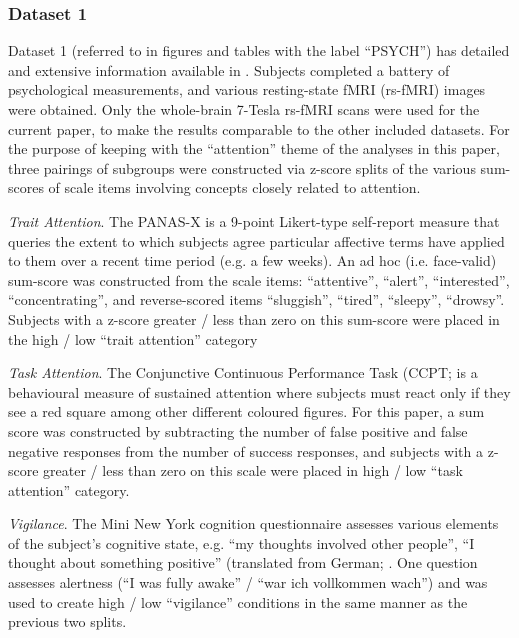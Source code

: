 \documentclass[10pt]{article}
\begin{document}
\subsubsection{Dataset 1}
Dataset 1 (referred to in figures and tables with the label ``PSYCH'') has detailed and extensive
information available in \cite{gorgolewskiHighResolution7Tesla2015}. Subjects completed a battery of
psychological measurements, and various resting-state fMRI (rs-fMRI) images were obtained. Only the
whole-brain 7-Tesla rs-fMRI scans were used for the current paper, to make the results comparable to
the other included datasets. For the purpose of keeping with the ``attention'' theme of the analyses
in this paper, three pairings of subgroups were constructed via z-score splits of the various
sum-scores of scale items involving concepts closely related to attention.

\emph{Trait Attention}.
The PANAS-X \citep{watsonPANASXManualPositive1994} is a 9-point Likert-type self-report measure
that queries the extent to which subjects agree particular affective terms have applied to them over
a recent time period (e.g. a few weeks). An ad hoc (i.e. face-valid) sum-score was constructed from
the scale items: ``attentive'', ``alert'', ``interested'', ``concentrating'', and reverse-scored items
``sluggish'', ``tired'', ``sleepy'', ``drowsy''. Subjects with a z-score greater / less than zero on this
sum-score were placed in the high / low ``trait attention'' category

\emph{Task Attention}.
The Conjunctive Continuous Performance Task (CCPT;
\cite{shalevConjunctiveContinuousPerformance2011} is a behavioural measure of sustained attention
where subjects must react only if they see a red square among other different coloured figures. For
this paper, a sum score was constructed by subtracting the number of false positive and false
negative responses from the number of success responses, and subjects with a z-score greater / less
than zero on this scale were placed in high / low ``task attention'' category.

\emph{Vigilance}.
The Mini New York cognition questionnaire assesses various elements of the subject's cognitive
state, e.g. ``my thoughts involved other people'', ``I thought about something positive'' (translated
from German; \cite{gorgolewskiCorrespondenceIndividualDifferences2014}. One question assesses
alertness (``I was fully awake'' / ``war ich vollkommen wach'') and was used to create high / low
``vigilance'' conditions in the same manner as the previous two splits.
\end{document}

